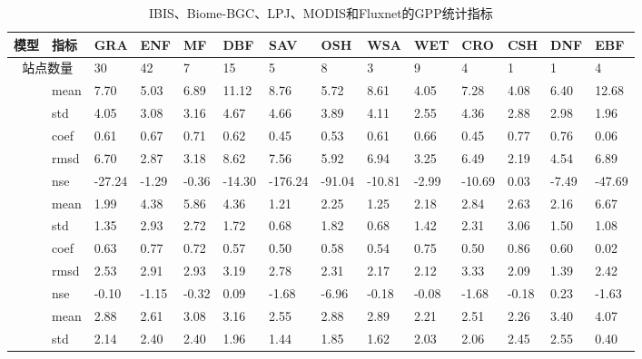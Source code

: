 \begin{table}
    \centering
    \caption{IBIS、Biome-BGC、LPJ、MODIS和Fluxnet的GPP统计指标}
    \label{tab:stats}
    \begin{threeparttable}
        \begin{tabular}{l|l|llllllllllll}
            \Xhline{1.5pt}
            模型 & 指标 & GRA & ENF & MF & DBF & SAV & OSH & WSA & WET & CRO & CSH & DNF & EBF \\
            \hline
            \multicolumn{2}{c}{站点数量} & 30 & 42 & 7 & 15 & 5 & 8 & 3 & 9 & 4 & 1 & 1 & 4 \\
            \Xhline{1.5pt}
            \parbox[t]{1mm}{} & mean & 7.70 & 5.03 & 6.89 & 11.12 & 8.76 & 5.72 & 8.61 & 4.05 & 7.28 & 4.08 & 6.40 & 12.68 \\
            & std & 4.05 & 3.08 & 3.16 & 4.67 & 4.66 & 3.89 & 4.11 & 2.55 & 4.36 & 2.88 & 2.98 & 1.96 \\
            & coef & 0.61 & 0.67 & 0.71 & 0.62 & 0.45 & 0.53 & 0.61 & 0.66 & 0.45 & 0.77 & 0.76 & 0.06 \\
            & rmsd & 6.70 & 2.87 & 3.18 & 8.62 & 7.56 & 5.92 & 6.94 & 3.25 & 6.49 & 2.19 & 4.54 & 6.89 \\
            & nse & -27.24 & -1.29 & -0.36 & -14.30 & -176.24 & -91.04 & -10.81 & -2.99 & -10.69 & 0.03 & -7.49 & -47.69 \\
            \hline
            \parbox[t]{1mm}{} & mean & 1.99 & 4.38 & 5.86 & 4.36 & 1.21 & 2.25 & 1.25 & 2.18 & 2.84 & 2.63 & 2.16 & 6.67 \\
            & std & 1.35 & 2.93 & 2.72 & 1.72 & 0.68 & 1.82 & 0.68 & 1.42 & 2.31 & 3.06 & 1.50 & 1.08 \\
            & coef & 0.63 & 0.77 & 0.72 & 0.57 & 0.50 & 0.58 & 0.54 & 0.75 & 0.50 & 0.86 & 0.60 & 0.02 \\
            & rmsd & 2.53 & 2.91 & 2.93 & 3.19 & 2.78 & 2.31 & 2.17 & 2.12 & 3.33 & 2.09 & 1.39 & 2.42 \\
            & nse & -0.10 & -1.15 & -0.32 & 0.09 & -1.68 & -6.96 & -0.18 & -0.08 & -1.68 & -0.18 & 0.23 & -1.63 \\
            \hline
            \parbox[t]{1mm}{} & mean & 2.88 & 2.61 & 3.08 & 3.16 & 2.55 & 2.88 & 2.89 & 2.21 & 2.51 & 2.26 & 3.40 & 4.07 \\
            & std & 2.14 & 2.40 & 2.40 & 1.96 & 1.44 & 1.85 & 1.62 & 2.03 & 2.06 & 2.45 & 2.55 & 0.40 \\

\end{tabular}
\end{threeparttable}
\end{table}

